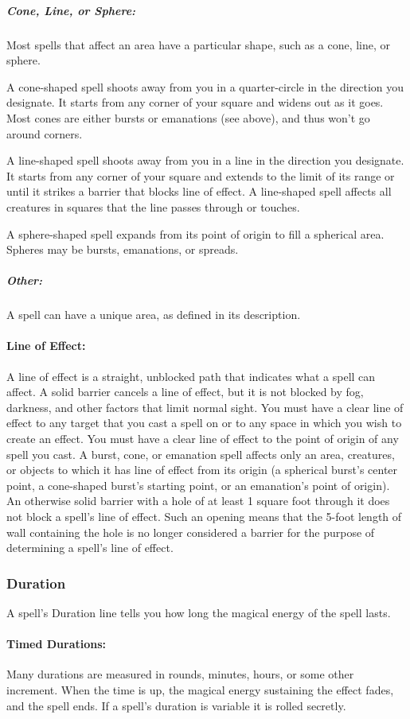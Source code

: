 \documentclass[../VancianToPsionics.tex]{subfiles}
\begin{document}
\subparagraph{Cone, Line, or Sphere:} Most spells that affect an area have a particular shape, such as a cone, line, or sphere. 

A cone-shaped spell shoots away from you in a quarter-circle in the direction you designate. 
It starts from any corner of your square and widens out as it goes. 
Most cones are either bursts or emanations (see above), and thus won't go around corners.

A line-shaped spell shoots away from you in a line in the direction you designate. 
It starts from any corner of your square and extends to the limit of its range or until it strikes a barrier that blocks line of effect. 
A line-shaped spell affects all creatures in squares that the line passes through or touches.

A sphere-shaped spell expands from its point of origin to fill a spherical area. Spheres may be bursts, emanations, or spreads.

\subparagraph{Other:} A spell can have a unique area, as defined in its description.

\paragraph{Line of Effect:} A line of effect is a straight, unblocked path that indicates what a spell can affect. 
A solid barrier cancels a line of effect, but it is not blocked by fog, darkness, and other factors that limit normal sight. 
You must have a clear line of effect to any target that you cast a spell on or to any space in which you wish to create an effect. 
You must have a clear line of effect to the point of origin of any spell you cast.
A burst, cone, or emanation spell affects only an area, creatures, or objects to which it has line of effect from its origin (a spherical burst's center point, a cone-shaped burst's starting point, or an emanation's point of origin). 
An otherwise solid barrier with a hole of at least 1 square foot through it does not block a spell's line of effect. 
Such an opening means that the 5-foot length of wall containing the hole is no longer considered a barrier for the purpose of determining a spell's line of effect.

\subsubsection{Duration}
A spell's Duration line tells you how long the magical energy of the spell lasts.

\paragraph{Timed Durations:} Many durations are measured in rounds, minutes, hours, or some other increment. When the time is up, the magical energy sustaining the effect fades, and the spell ends. If a spell's duration is variable it is rolled secretly.
\end{document}
